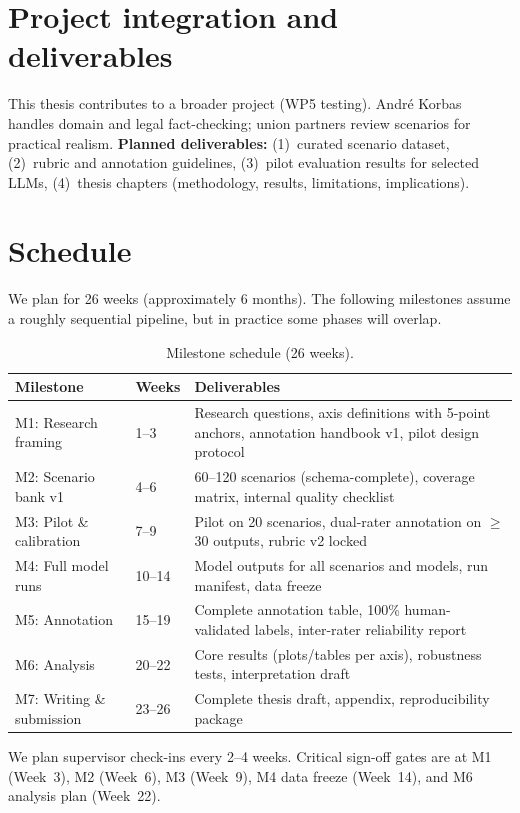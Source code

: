 \documentclass[11pt,a4paper]{article}
\begin{document}
\section{Project integration and deliverables}
This thesis contributes to a broader project (WP5 testing). Andr\'e Korbas handles domain and legal fact-checking; union partners review scenarios for practical realism. \textbf{Planned deliverables:} (1)~curated scenario dataset, (2)~rubric and annotation guidelines, (3)~pilot evaluation results for selected LLMs, (4)~thesis chapters (methodology, results, limitations, implications).


\section{Schedule}
We plan for 26 weeks (approximately 6 months). The following milestones assume a roughly sequential pipeline, but in practice some phases will overlap.

\begin{table}[h]
\centering
\small
\begin{tabular}{@{}llp{7.5cm}@{}}
\toprule
\textbf{Milestone} & \textbf{Weeks} & \textbf{Deliverables} \\
\midrule
M1: Research framing    & 1--3   & Research questions, axis definitions with 5-point anchors, annotation handbook v1, pilot design protocol \\
M2: Scenario bank v1    & 4--6   & 60--120 scenarios (schema-complete), coverage matrix, internal quality checklist \\
M3: Pilot \& calibration & 7--9   & Pilot on 20 scenarios, dual-rater annotation on $\geq$30 outputs, rubric v2 locked \\
M4: Full model runs     & 10--14 & Model outputs for all scenarios and models, run manifest, data freeze \\
M5: Annotation          & 15--19 & Complete annotation table, 100\% human-validated labels, inter-rater reliability report \\
M6: Analysis            & 20--22 & Core results (plots/tables per axis), robustness tests, interpretation draft \\
M7: Writing \& submission & 23--26 & Complete thesis draft, appendix, reproducibility package \\
\bottomrule
\end{tabular}
\caption{Milestone schedule (26 weeks).}
\end{table}

We plan supervisor check-ins every 2--4 weeks. Critical sign-off gates are at M1 (Week~3), M2 (Week~6), M3 (Week~9), M4 data freeze (Week~14), and M6 analysis plan (Week~22).
\end{document}
